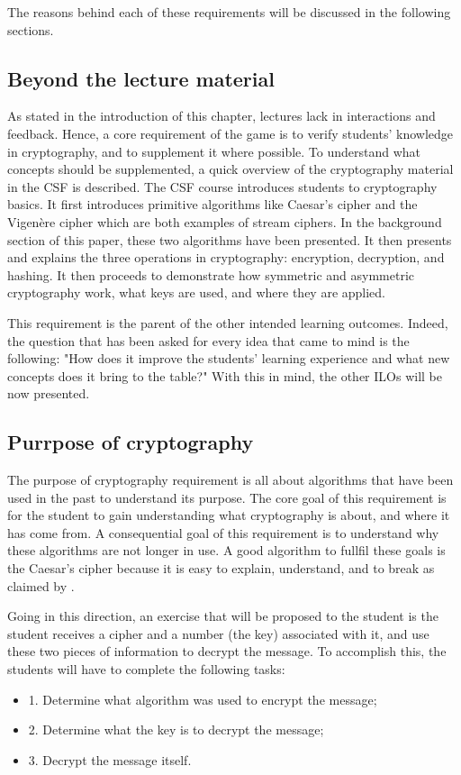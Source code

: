 \documentclass{l4proj}
\begin{document}
The reasons behind each of these requirements will be discussed in the following sections.

\subsection{Beyond the lecture material}

As stated in the introduction of this chapter, lectures lack in interactions and feedback.
Hence, a core requirement of the game is to verify students' knowledge in cryptography, 
and to supplement it where possible. To understand what concepts should be supplemented, 
a quick overview of the cryptography material in the CSF is described.
The CSF course introduces students to cryptography basics.
It first introduces primitive algorithms like Caesar's cipher and the Vigenère cipher which are both
examples of stream ciphers. 
In the background section of this paper, these two algorithms have been presented.
It then presents and explains the three operations in cryptography: encryption, decryption, and hashing.
It then proceeds to demonstrate how symmetric and asymmetric cryptography work, what keys are used, and where they are applied.

This requirement is the parent of the other intended learning outcomes. 
Indeed, the question that has been asked for every idea that came to mind is the following:
"How does it improve the students' learning experience and what new concepts does it bring to the table?"
With this in mind, the other ILOs will be now presented.

\subsection{Purrpose of cryptography}

The purpose of cryptography requirement is all about algorithms that have been used in the past to understand its purpose.
The core goal of this requirement is for the student to gain understanding what cryptography is about, and where it has come from.
A consequential goal of this requirement is to understand why these algorithms are not longer in use.
A good algorithm to fullfil these goals is the Caesar's cipher because it is easy to explain, 
understand, and to break as claimed by \citet{anderson_security_2008}.

Going in this direction, an exercise that will be proposed to the student is
the student receives a cipher and a number (the key) associated with it, and use these two pieces of information to decrypt the message.
To accomplish this, the students will have to complete the following tasks:
\begin{itemize}
    \item 1. Determine what algorithm was used to encrypt the message;
    \item 2. Determine what the key is to decrypt the message;
    \item 3. Decrypt the message itself.
\end{itemize}
\end{document}
